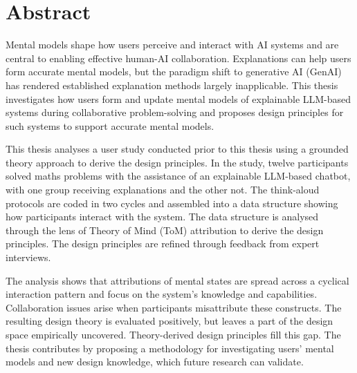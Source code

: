 \section*{Abstract}

Mental models shape how users perceive and interact with AI systems and are central to enabling effective human-AI collaboration. Explanations can help users form accurate mental models, but the paradigm shift to generative AI (GenAI) has rendered established explanation methods largely inapplicable. This thesis investigates how users form and update mental models of explainable LLM-based systems during collaborative problem-solving and proposes design principles for such systems to support accurate mental models.

This thesis analyses a user study conducted prior to this thesis using a grounded theory approach to derive the design principles. In the study, twelve participants solved maths problems with the assistance of an explainable LLM-based chatbot, with one group receiving explanations and the other not. The think-aloud protocols are coded in two cycles and assembled into a data structure showing how participants interact with the system. The data structure is analysed through the lens of Theory of Mind (ToM) attribution to derive the design principles. The design principles are refined through feedback from expert interviews.

The analysis shows that attributions of mental states are spread across a cyclical interaction pattern and focus on the system's knowledge and capabilities. Collaboration issues arise when participants misattribute these constructs. The resulting design theory is evaluated positively, but leaves a part of the design space empirically uncovered. Theory-derived design principles fill this gap. The thesis contributes by proposing a methodology for investigating users' mental models and new design knowledge, which future research can validate.
